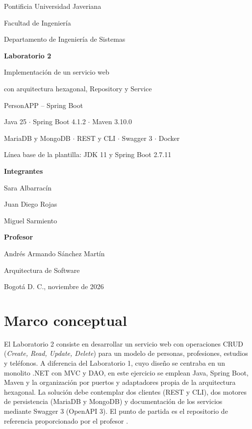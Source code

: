 \documentclass[11pt,a4paper]{article}
\begin{document}
\begin{titlepage}
\thispagestyle{empty}
\begin{center}
{\large Pontificia Universidad Javeriana\par}
\vspace{0.25cm}
{Facultad de Ingeniería\par}
{Departamento de Ingeniería de Sistemas\par}
\vspace{3.0cm}
{\LARGE\bfseries Laboratorio 2\par}
\vspace{0.45cm}
{\Large Implementación de un servicio web\par}
{\Large con arquitectura hexagonal, Repository y Service\par}
\vspace{0.65cm}
{\large PersonAPP -- Spring Boot\par}
\vspace{0.8cm}
{Java 25 \(\cdot\) Spring Boot 4.1.2 \(\cdot\) Maven 3.10.0\par}
{MariaDB y MongoDB \(\cdot\) REST y CLI \(\cdot\) Swagger 3 \(\cdot\) Docker\par}
\vspace{0.3cm}
{\small Línea base de la plantilla: JDK 11 y Spring Boot 2.7.11\par}
\vfill
\textbf{Integrantes}\par
Sara Albarracín\par
Juan Diego Rojas\par
Miguel Sarmiento\par
\vspace{1cm}
\textbf{Profesor}\par
Andrés Armando Sánchez Martín\par
\vspace{1cm}
Arquitectura de Software\par
Bogotá D. C., noviembre de 2026\par
\end{center}
\end{titlepage}
\tableofcontents
\clearpage

\section{Marco conceptual}
El Laboratorio 2 consiste en desarrollar un servicio web con operaciones CRUD
(\emph{Create, Read, Update, Delete}) para un modelo de personas, profesiones,
estudios y teléfonos. A diferencia del Laboratorio 1, cuyo diseño se centraba
en un monolito .NET con MVC y DAO, en este ejercicio se emplean Java, Spring Boot,
Maven y la organización por puertos y adaptadores propia de la arquitectura hexagonal.
La solución debe contemplar dos clientes (REST y CLI), dos motores de persistencia
(MariaDB y MongoDB) y documentación de los servicios mediante Swagger 3 (OpenAPI 3).
El punto de partida es el repositorio de referencia proporcionado por el profesor
\cite{plantilla}.
\end{document}
